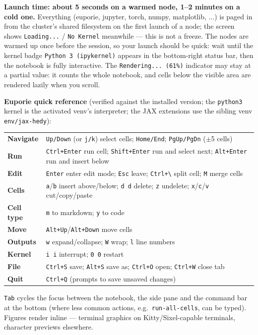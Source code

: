 \documentclass[11pt,a4paper]{article}
\begin{document}
\textbf{Launch time: about 5 seconds on a warmed node, 1--2 minutes on a cold one.}
Everything (euporie, jupyter, torch, numpy, matplotlib, ...) is paged in from the cluster's
shared filesystem on the first launch of a node; the screen shows \texttt{Loading...} /
\texttt{No Kernel} meanwhile --- this is not a freeze. The nodes are warmed up once before
the session, so your launch should be quick: wait until the kernel badge
\texttt{Python 3 (ipykernel)} appears in the bottom-right status bar, then the notebook is
fully interactive. The \texttt{Rendering... (61\%)} indicator may stay at a partial value:
it counts the whole notebook, and cells below the visible area are rendered lazily when
you scroll.

\textbf{Euporie quick reference} (verified against the installed version; the \texttt{python3}
kernel is the activated venv's interpreter; the JAX extensions use the sibling venv
\texttt{env/jax-hedy}):

\begin{center}
\small
\begin{tabular}{@{}ll@{}}
\toprule
\textbf{Navigate} & \texttt{Up/Down} (or \texttt{j/k}) select cells; \texttt{Home/End};
  \texttt{PgUp/PgDn} ($\pm$5 cells)\\
\textbf{Run} & \texttt{Ctrl+Enter} run cell; \texttt{Shift+Enter} run and select next;
  \texttt{Alt+Enter} run and insert below\\
\textbf{Edit} & \texttt{Enter} enter edit mode; \texttt{Esc} leave;
  \texttt{Ctrl+\textbackslash} split cell; \texttt{M} merge cells\\
\textbf{Cells} & \texttt{a}/\texttt{b} insert above/below; \texttt{d d} delete; \texttt{z} undelete;
  \texttt{x}/\texttt{c}/\texttt{v} cut/copy/paste\\
\textbf{Cell type} & \texttt{m} to markdown; \texttt{y} to code\\
\textbf{Move} & \texttt{Alt+Up}/\texttt{Alt+Down} move cells\\
\textbf{Outputs} & \texttt{w} expand/collapse; \texttt{W} wrap; \texttt{l} line numbers\\
\textbf{Kernel} & \texttt{i i} interrupt; \texttt{0 0} restart\\
\textbf{File} & \texttt{Ctrl+S} save; \texttt{Alt+S} save as; \texttt{Ctrl+O} open;
  \texttt{Ctrl+W} close tab\\
\textbf{Quit} & \texttt{Ctrl+Q} (prompts to save unsaved changes)\\
\bottomrule
\end{tabular}
\end{center}

\texttt{Tab} cycles the focus between the notebook, the side pane and the command bar at the
bottom (where less common actions, e.g.\ \texttt{run-all-cells}, can be typed). Figures render
inline --- terminal graphics on Kitty/Sixel-capable terminals, character previews elsewhere.
\end{document}
